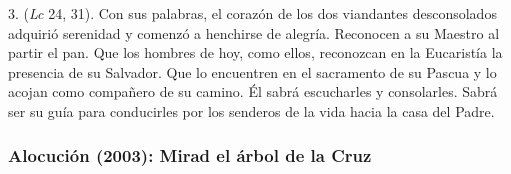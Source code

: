 \begin{body}
3.  (\textit{Lc} 24, 31). Con sus palabras, el corazón de los dos viandantes desconsolados adquirió serenidad y comenzó a henchirse de alegría. Reconocen a su Maestro al partir el pan. Que los hombres de hoy, como ellos, reconozcan en la Eucaristía la presencia de su Salvador. Que lo encuentren en el sacramento de su Pascua y lo acojan como compañero de su camino. Él sabrá escucharles y consolarles. Sabrá ser su guía para conducirles por los senderos de la vida hacia la casa del Padre.

\end{body}


\subsubsection{Alocución (2003): Mirad el árbol de la Cruz}


